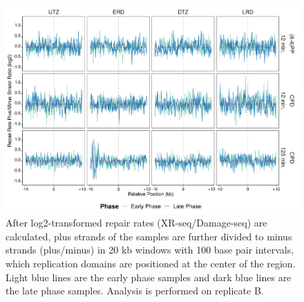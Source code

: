 \begin{figure}[H]
\begin{center}
\includegraphics[width=\textwidth]{Chapters/7_appendix/figures/supfig31}
\caption[Repair rate plus/minus phase ratio of replication domains in 20 kb (replicate B).]{After log2-transformed repair rates (XR-seq/Damage-seq) are calculated, plus strands of the samples are further divided to minus strands (plus/minus) in 20 kb windows with 100 base pair intervals, which replication domains are positioned at the center of the region. Light blue lines are the early phase samples and dark blue lines are the late phase samples. Analysis is performed on replicate B.}
\label{supfig:rrpm20repdomainB}
\end{center}
\end{figure}

